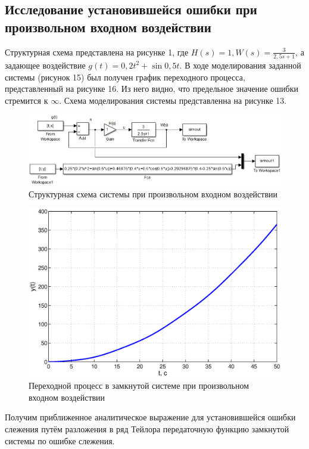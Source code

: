 \documentclass[12pt,a4paper]{article}
\begin{document}
\newpage
\begin{center}
\section{Исследование установившейся ошибки при произвольном входном воздействии}
\end{center}
 Структурная схема представлена на рисунке 1, где $H(s) = 1, W(s) = \displaystyle{\frac{3}{2,5s + 1}}$, а задающее воздействие $g(t) = 0,2t^2 + \sin{0,5t}$.
 В ходе моделирования заданной системы (рисунок 15) был получен график переходного процесса, представленный на рисунке 16. Из него видно, что предельное значение ошибки стремится к $\infty$. Схема моделирования системы представленна на рисунке 13.
\begin{figure}[H]
    \centering
    \includegraphics[width=1\linewidth]{cxema4.eps}
    \caption{Структурная схема системы при произвольном входном воздействии}
\end{figure}
\begin{figure}[H]
    \centering
    \includegraphics[width=1\linewidth]{4.1.eps}
    \caption{Переходной процесс в замкнутой системе при произвольном входном воздействии}
\end{figure}
Получим приближенное аналитическое выражение для установившейся ошибки слежения путём разложения в ряд Тейлора передаточную функцию замкнутой системы по ошибке слежения.
\end{document}
